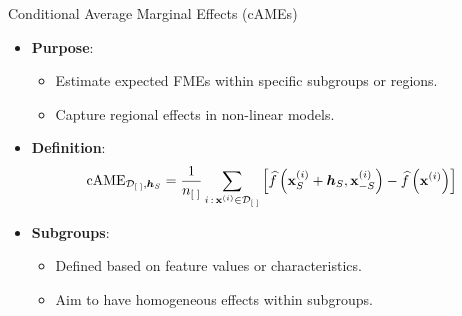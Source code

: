 \documentclass[10pt,compress,t,notes=noshow, xcolor=table]{beamer}
\newcommand{\boldhS}{\bm{h}_{S}}
\begin{document}

\begin{frame}{Conditional Average Marginal Effects (cAMEs)}
\begin{itemize}
\item \textbf{Purpose}:
\begin{itemize}
\item Estimate expected FMEs within specific subgroups or regions.
\item Capture regional effects in non-linear models.
\end{itemize}
\item \textbf{Definition}:
\[
\text{cAME}_{\mathcal{D}_{[\;]}, \boldhS} = \frac{1}{n_{[\;]}} \sum_{i \,:\, \xv^{(i)} \in \mathcal{D}_{[\;]}} \left[ \widehat{f}\left(\xv_S^{(i)} + \boldhS, \xv_{-S}^{(i)}\right) - \widehat{f}\left(\xv^{(i)}\right) \right]
\]
\item \textbf{Subgroups}:
\begin{itemize}
\item Defined based on feature values or characteristics.
\item Aim to have homogeneous effects within subgroups.
\end{itemize}
\end{itemize}
\end{frame}
\end{document}
